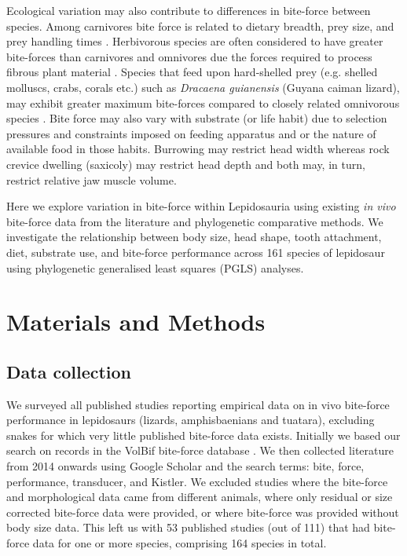 \documentclass[a4paper, 12pt]{article}
\begin{document}
Ecological variation may also contribute to differences in bite-force between species. Among carnivores bite force is related to dietary breadth, prey size, and prey handling times \citep{verwaijen2002relationships,herrel2006ecological}.
Herbivorous species are often considered to have greater bite-forces than carnivores and omnivores due the forces required to process fibrous plant material \citep{cooper2002distribution,herrel1999morphology,metzger2005correlations,herrel2004omnivory,Herrel2008}.
Species that feed upon hard-shelled prey (e.g. shelled molluscs, crabs, corals etc.) such as \textit{Dracaena guianensis} (Guyana caiman lizard), may exhibit greater maximum bite-forces compared to closely related omnivorous species \citep{schaerlaeken2012built}. 
Bite force may also vary with substrate (or life habit) due to selection pressures and constraints imposed on feeding apparatus \citep[such as the skull structure;][]{hipsley2017developmental,gray2019changes,gray2019evolution} and or the nature of available food in those habits. 
Burrowing may restrict head width \citep{vanhooydonck2011push} whereas rock crevice dwelling (saxicoly) may restrict head depth \citep[e.g. crevices;][]{lappin2006biteB} and both may, in turn, restrict relative jaw muscle volume. 

Here we explore variation in bite-force within Lepidosauria using existing \textit{in vivo} bite-force data from the literature and phylogenetic comparative methods. 
We investigate the relationship between body size, head shape, tooth attachment, diet, substrate use, and bite-force performance across 161 species of lepidosaur using phylogenetic generalised least squares (PGLS) analyses.


\section{Materials and Methods}

\subsection{Data collection}
We surveyed all published studies reporting empirical data on in vivo bite-force performance in lepidosaurs (lizards, amphisbaenians and tuatara), excluding snakes for which very little published bite-force data exists. 
Initially we based our search on records in the VolBif bite-force database \citep{lappin2014reliable}. 
We then collected literature from 2014 onwards using Google Scholar and the search terms: bite, force, performance, transducer, and Kistler. 
We excluded studies where the bite-force and morphological data came from different animals, where only residual or size corrected bite-force data were provided, or where bite-force was provided without body size data. 
This left us with 53 published studies (out of 111) that had bite-force data for one or more species, comprising 164 species in total. 
\end{document}

